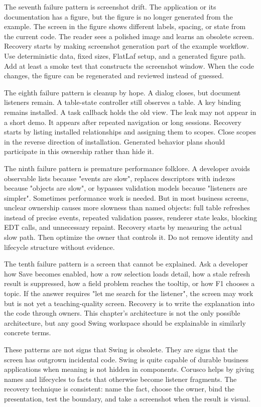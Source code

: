 The seventh failure pattern is screenshot drift. The application or its documentation has a
figure, but the figure is no longer generated from the example. The screen in
the figure shows different labels, spacing, or state from the current code. The
reader sees a polished image and learns an obsolete screen. Recovery starts by
making screenshot generation part of the example workflow. Use deterministic
data, fixed sizes, FlatLaf setup, and a generated figure path. Add at least a
smoke test that constructs the screenshot window. When the code changes, the
figure can be regenerated and reviewed instead of guessed.

The eighth failure pattern is cleanup by hope. A dialog closes, but document
listeners remain. A table-state controller still observes a table. A key
binding remains installed. A task callback holds the old view. The leak may
not appear in a short demo. It appears after repeated navigation or long
sessions. Recovery starts by listing installed relationships and assigning
them to scopes. Close scopes in the reverse direction of installation.
Generated behavior plans should participate in this ownership rather than
hide it.

The ninth failure pattern is premature performance folklore. A developer
avoids observable lists because "events are slow", replaces descriptors with
indexes because "objects are slow", or bypasses validation models because
"listeners are simpler". Sometimes performance work is needed. But in most
business screens, unclear ownership causes more slowness than named objects:
full table refreshes instead of precise events, repeated validation passes,
renderer state leaks, blocking EDT calls, and unnecessary repaint. Recovery
starts by measuring the actual slow path. Then optimize the owner that
controls it. Do not remove identity and lifecycle structure without evidence.

The tenth failure pattern is a screen that cannot be explained. Ask a
developer how Save becomes enabled, how a row selection loads detail, how a
stale refresh result is suppressed, how a field problem reaches the tooltip,
or how F1 chooses a topic. If the answer requires "let me search for the
listener", the screen may work but is not yet a teaching-quality screen.
Recovery is to write the explanation into the code through owners. This
chapter's architecture is not the only possible architecture, but any good
Swing workspace should be explainable in similarly concrete terms.

These patterns are not signs that Swing is obsolete. They are signs that the
screen has outgrown incidental code. Swing is quite capable of durable
business applications when meaning is not hidden in components. Corusco helps
by giving names and lifecycles to facts that otherwise become listener
fragments. The recovery technique is consistent: name the fact, choose the
owner, bind the presentation, test the boundary, and take a screenshot when
the result is visual.

